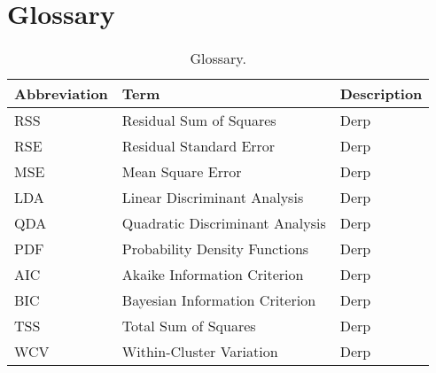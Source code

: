 \chapter*{Glossary}


\begin{table}[H]
	\centering
	\begin{tabularx}{\linewidth}{|l|l|X|}
		\hline
		\textbf{Abbreviation} 	& \textbf{Term} 					& \textbf{Description} 		\\ \hline
		RSS 					& Residual Sum of Squares			& Derp \\ \hline
		RSE 					& Residual Standard Error			& Derp \\ \hline
		MSE 					& Mean Square Error					& Derp \\ \hline
		LDA 					& Linear Discriminant Analysis		& Derp \\ \hline
		QDA 					& Quadratic Discriminant Analysis	& Derp \\ \hline
		PDF						& Probability Density Functions		& Derp \\ \hline
		AIC						& Akaike Information Criterion		& Derp \\ \hline
		BIC						& Bayesian Information Criterion	& Derp \\ \hline
		TSS						& Total Sum of Squares				& Derp \\ \hline
		WCV						& Within-Cluster Variation			& Derp \\ \hline
	\end{tabularx}
	\caption{Glossary.}
	\label{tab:glossary}
\end{table}